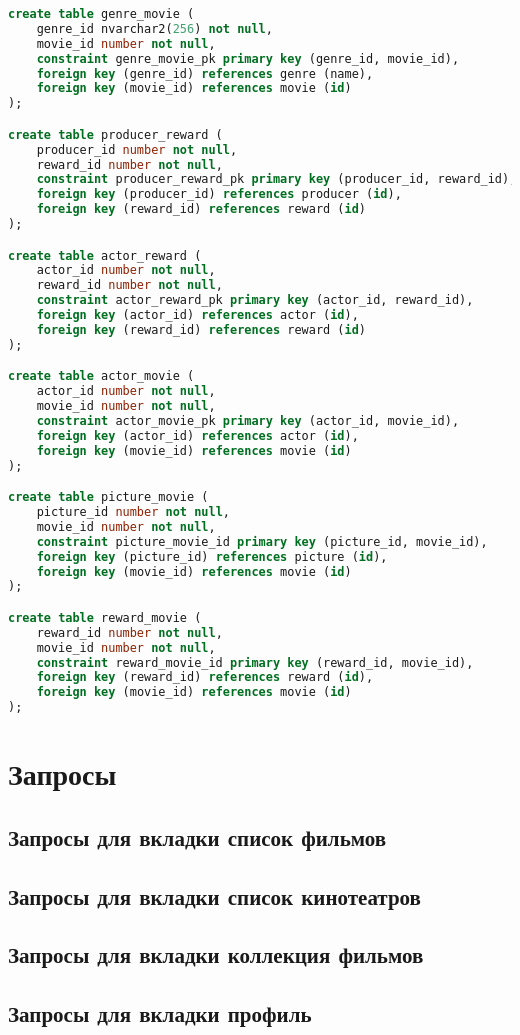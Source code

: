 \documentclass[a4paper,16pt]{article}
\begin{document}
\begin{lstlisting}[language=SQL]
create table genre_movie (
    genre_id nvarchar2(256) not null,
    movie_id number not null,
    constraint genre_movie_pk primary key (genre_id, movie_id),
    foreign key (genre_id) references genre (name),
    foreign key (movie_id) references movie (id)
);

create table producer_reward (
    producer_id number not null,
    reward_id number not null, 
    constraint producer_reward_pk primary key (producer_id, reward_id),
    foreign key (producer_id) references producer (id),
    foreign key (reward_id) references reward (id)
);

create table actor_reward (
    actor_id number not null,
    reward_id number not null,
    constraint actor_reward_pk primary key (actor_id, reward_id),
    foreign key (actor_id) references actor (id),
    foreign key (reward_id) references reward (id)
);

create table actor_movie (
    actor_id number not null,
    movie_id number not null,
    constraint actor_movie_pk primary key (actor_id, movie_id),
    foreign key (actor_id) references actor (id),
    foreign key (movie_id) references movie (id)
);

create table picture_movie (
    picture_id number not null,
    movie_id number not null,
    constraint picture_movie_id primary key (picture_id, movie_id),
    foreign key (picture_id) references picture (id),
    foreign key (movie_id) references movie (id)
);

create table reward_movie (
    reward_id number not null,
    movie_id number not null,
    constraint reward_movie_id primary key (reward_id, movie_id),
    foreign key (reward_id) references reward (id),
    foreign key (movie_id) references movie (id)
);
\end{lstlisting}

\section{Запросы}
\subsection{Запросы для вкладки список фильмов}
\subsection{Запросы для вкладки список кинотеатров}
\subsection{Запросы для вкладки коллекция фильмов}
\subsection{Запросы для вкладки профиль}
\end{document}

